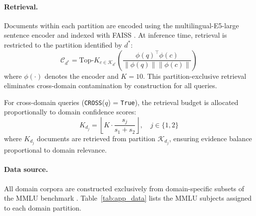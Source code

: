 \documentclass[a4paper,fleql,doubleblind]{cas-sc}
\begin{document}
\paragraph{Retrieval.}
Documents within each partition are encoded using the multilingual-E5-large
sentence encoder \citep{wang2024multilingual} and indexed with FAISS
\citep{johnson2019faiss}. At inference time, retrieval is restricted to the
partition identified by $d^*$:
\begin{equation}
    \mathcal{C}_{d^*} = \text{Top-}K_{c \in \mathcal{K}_{d^*}} \left(
    \frac{\phi(q)^\top \phi(c)}{\|\phi(q)\| \|\phi(c)\|} \right)
    \label{eq:retrieval}
\end{equation}
where $\phi(\cdot)$ denotes the encoder and $K = 10$. This
partition-exclusive retrieval eliminates cross-domain contamination by
construction for all queries.

For cross-domain queries (\texttt{CROSS}($q$) = \texttt{True}), the
retrieval budget is allocated proportionally to domain confidence scores:
\begin{equation}
    K_{d_j} = \left\lfloor K \cdot \frac{s_j}{s_1 + s_2} \right\rfloor,
    \quad j \in \{1, 2\}
    \label{eq:budget}
\end{equation}
where $K_{d_j}$ documents are retrieved from partition $\mathcal{K}_{d_j}$,
ensuring evidence balance proportional to domain relevance.


\paragraph{Data source.}
All domain corpora are constructed exclusively from domain-specific subsets of
the MMLU benchmark \citep{hendrycks2021mmlu}. Table~\ref{tab:app_data} lists
the MMLU subjects assigned to each domain partition.
\end{document}
